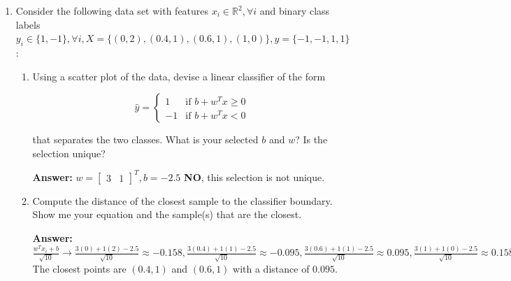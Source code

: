 \documentclass{assignment}
\newcommand{\R}{\mathbb{R}}
\begin{document}
\begin{problem}
\begin{enumerate}

    \item Consider the following data set with features $x_i \in \R^2, \forall i$ and binary class labels $y_i \in \{1, -1\}, \forall i, X = \{(0,2), (0.4,1), (0.6,1), (1,0)\}, y = \{-1, -1, 1, 1\}$:
    
    \begin{enumerate}[label=(\alph*)]

    
        \item Using a scatter plot of the data, devise a linear classifier of the form

        \begin{equation}
            \hat{y} = \begin{cases}
                1 &  \text{if } b + w^Tx \geq 0\\
                -1 & \text{if } b + w^Tx < 0
                \tag*{(1-1)}
            \end{cases} 
        \end{equation}

        that separates the two classes. What is your selected $b$ and $w$? Is the selection unique?

        \color{blue}\textbf{Answer:} $w = \begin{bmatrix}3 & 1\end{bmatrix}^T, b = -2.5$ \textbf{NO}, this selection is not unique. \color{black}


        
        \item Compute the distance of the closest sample to the classifier boundary. Show me your equation and the sample(s) that are the closest.

        \color{blue}\textbf{Answer:} $\frac{w^T x_i + b}{\sqrt{10}} \rightarrow \frac{3(0) + 1(2) - 2.5}{\sqrt{10}} \approx -0.158, \frac{3(0.4) + 1(1) - 2.5}{\sqrt{10}} \approx -0.095, \frac{3(0.6) + 1(1) - 2.5}{\sqrt{10}} \approx 0.095, \frac{3(1) + 1(0) - 2.5}{\sqrt{10}} \approx 0.158$\\
        The closest points are $(0.4,1)$ and $(0.6,1)$ with a distance of $0.095$. \color{black}


\end{enumerate}
\end{enumerate}
\end{problem}
\end{document}
